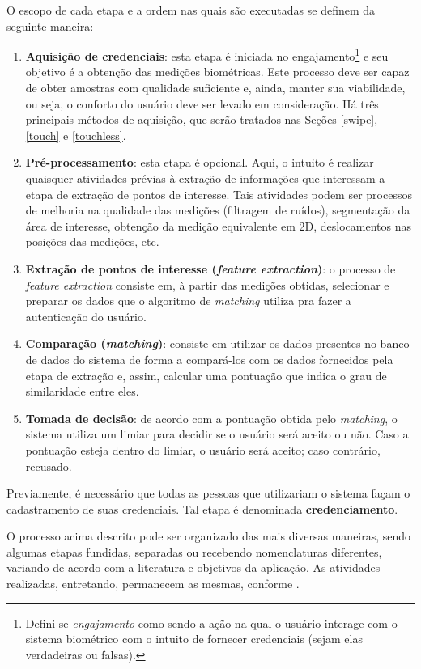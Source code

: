O escopo de cada etapa e a ordem nas quais são executadas se definem da seguinte maneira:

\begin{enumerate}
	\item \textbf{Aquisição de credenciais}: esta etapa é iniciada no engajamento\footnote{Defini-se \emph{engajamento} como sendo a ação na qual o usuário interage com o sistema biométrico com o intuito de fornecer credenciais (sejam elas verdadeiras ou falsas).} e seu objetivo é a obtenção das medições biométricas. Este processo deve ser capaz de obter amostras com qualidade suficiente e, ainda, manter sua viabilidade, ou seja, o conforto do usuário deve ser levado em consideração. Há três principais métodos de aquisição, que serão tratados nas Seções \ref{swipe}, \ref{touch} e \ref{touchless}.
	\item \textbf{Pré-processamento}: esta etapa é opcional. Aqui, o intuito é realizar quaisquer atividades prévias à extração de informações que interessam a etapa de extração de pontos de interesse. Tais atividades podem ser processos de melhoria na qualidade das medições (filtragem de ruídos), segmentação da área de interesse, obtenção da medição equivalente em 2D, deslocamentos nas posições das medições, etc.
	\item \textbf{Extração de pontos de interesse (\textit{feature extraction})}: o processo de \textit{feature extraction} consiste em, à partir das medições obtidas, selecionar e preparar os dados que o algoritmo de \textit{matching} utiliza pra fazer a autenticação do usuário.
	\item \textbf{Comparação (\textit{matching})}: consiste em utilizar os dados presentes no banco de dados do sistema de forma a compará-los com os dados fornecidos pela etapa de extração e, assim, calcular uma pontuação que indica o grau de similaridade entre eles.
	\item \textbf{Tomada de decisão}: de acordo com a pontuação obtida pelo \textit{matching}, o sistema utiliza um limiar para decidir se o usuário será aceito ou não. Caso a pontuação esteja dentro do limiar, o usuário será aceito; caso contrário, recusado.
\end{enumerate}

Previamente, é necessário que todas as pessoas que utilizariam o sistema façam o cadastramento de suas credenciais. Tal etapa é denominada \textbf{credenciamento}.

O processo acima descrito pode ser organizado das mais diversas maneiras, sendo algumas etapas fundidas, separadas ou recebendo nomenclaturas diferentes, variando de acordo com a literatura e objetivos da aplicação. As atividades realizadas, entretando, permanecem as mesmas, conforme .

